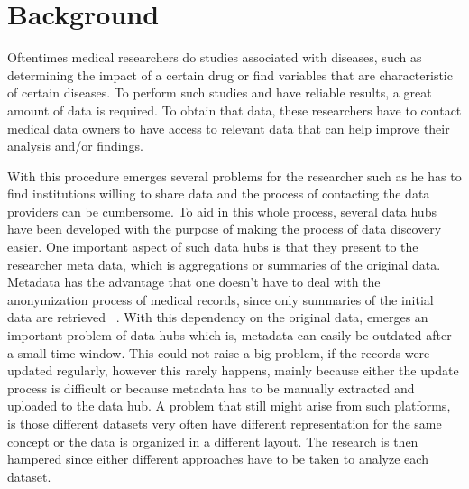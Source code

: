\chapter{Background}
\label{chapter:background}
\graphicspath{{figs/02-background/}}

Oftentimes medical researchers do studies associated with diseases, such as determining the impact of a certain drug or find variables that are characteristic of certain diseases.
To perform such studies and have reliable results, a great amount of data is required.
To obtain that data, these researchers have to contact medical data owners to have access to relevant data that can help improve their analysis and/or findings.

With this procedure emerges several problems for the researcher such as he has to find
institutions willing to share data and the process of contacting the data providers can
be cumbersome.
To aid in this whole process, several data hubs have been developed with the purpose of
making the process of data discovery easier.
One important aspect of such data hubs is that they present to the researcher meta
data, which is aggregations or summaries of the original data.
Metadata has the advantage that one doesn't have to deal with the anonymization process
of medical records, since only summaries of the initial data are retrieved
~\cite{egenvar, montra}.
With this dependency on the original data, emerges an important problem of data hubs
which is, metadata can easily be outdated after a small time window.
This could not raise a big problem, if the records were updated regularly, however this
rarely happens, mainly because either the update process is difficult or because
metadata has to be manually extracted and uploaded to the data hub.
A problem that still might arise from such platforms, is those different datasets very
often have different representation for the same concept or the data is organized in a
different layout.
The research is then hampered since either different approaches have to be taken to
analyze each dataset.

